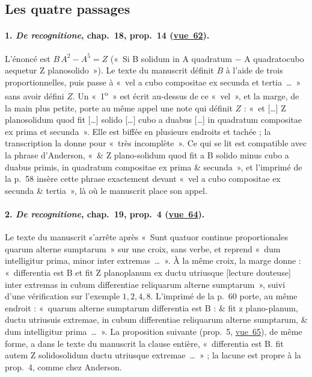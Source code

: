 \documentclass[11pt,a4paper]{article}
\theoremstyle{remark}
\newcommand{\vue}[1]{\href{https://gallica.bnf.fr/ark:/12148/btv1b10033620q/f#1.item}{vue~#1}}
\begin{document}
\subsection{Les quatre passages}

\paragraph{1. \emph{De recognitione}, chap.~18, prop.~14 (\vue{62}).}
L'énoncé est
$B\,A^2 - A^5 = Z$ («~Si B solidum in A quadratum $-$ A quadratocubo
aequetur Z planosolido~»). Le texte du manuscrit définit $B$ à l'aide de
trois proportionnelles, puis passe à «~vel a cubo compositae ex secunda et
tertia~\dots~» sans avoir défini $Z$. Un «~1\textsuperscript{o}~» est écrit
au-dessus de ce «~vel~», et la marge, de la main plus petite, porte au même
appel une note qui définit $Z$ : «~et [\dots] Z planosolidum quod fit
[\dots] solido [\dots] cubo a duabus [\dots] in quadratum compositae ex
prima et secunda~». Elle est biffée en plusieurs endroits et tachée ; la
transcription la donne pour «~très incomplète~». Ce qui se lit est compatible
avec la phrase d'Anderson, «~\& Z plano-solidum quod fit a B solido minus
cubo a duabus primis, in quadratum compositae ex prima \& secunda~», et
l'imprimé de la p.~58 insère cette phrase exactement devant «~vel a cubo
compositae ex secunda \& tertia~», là où le manuscrit place son appel.

\paragraph{2. \emph{De recognitione}, chap.~19, prop.~4 (\vue{64}).}
Le texte du manuscrit s'arrête après «~Sunt quatuor continue proportionales
quarum alterne sumptarum~» sur une croix, sans verbe, et reprend «~dum
intelligitur prima, minor inter extremas~\dots~». À la même croix, la marge
donne : «~differentia est B et fit Z planoplanum ex ductu utriusque [lecture
douteuse] inter extremas in cubum differentiae reliquarum alterne
sumptarum~», suivi d'une vérification sur l'exemple $1, 2, 4, 8$. L'imprimé
de la p.~60 porte, au même endroit : «~quarum alterne sumptarum differentia
est B : \& fit z plano-planum, ductu utriusuis extremae, in cubum
differentiae reliquarum alterne sumptarum, \& dum intelligitur prima~\dots~».
La proposition suivante (prop.~5, \vue{65}), de même forme, a dans le texte
du manuscrit la clause entière, «~differentia est B. fit autem Z
solidosolidum ductu utriusque extremae~\dots~» ; la lacune est propre à la
prop.~4, comme chez Anderson.
\end{document}
